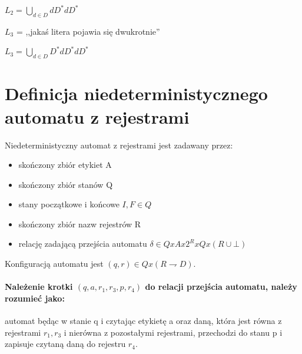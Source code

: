 \documentclass[a4paper,12pt]{report}
\begin{document}
$L_2 = {\bigcup \limits _{d \in D} dD^*dD^*}$

$L_3$ = ,,jakaś litera pojawia się dwukrotnie''

$L_3 = {\bigcup \limits _{d \in D} D^*dD^*dD^*}$

\section {Definicja niedeterministycznego automatu z rejestrami}
Niedeterministyczny automat z rejestrami jest zadawany przez:
\begin{itemize}
\item skończony zbiór etykiet A
\item skończony zbiór stanów Q
\item stany początkowe i końcowe $I,F \in Q$
\item skończony zbiór nazw rejestrów R
\item relację zadającą przejścia automatu $\delta 
\in Q x A x 2^R x Q x (R \cup \bot)$
\end{itemize}

Konfiguracją automatu jest $(q,r) \in Q x (R \rightharpoondown D)$.

\paragraph {Należenie krotki $(q,a,r_1,r_3,p,r_4)$ do relacji przejścia automatu, należy rozumieć jako:} automat będąc w stanie q i czytając etykietę a oraz daną, która jest równa z rejestrami $r_1,r_3$ i nierówna z pozostałymi rejestrami, przechodzi do stanu p i zapisuje czytaną daną do rejestru $r_4$.
\end{document}

